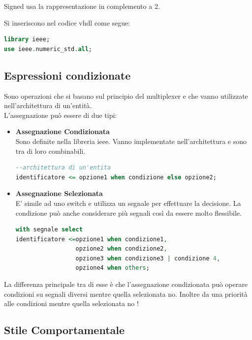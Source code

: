 \documentclass[a4paper]{book}
\begin{document}
Signed usa la rappresentazione in complemento a 2.


Si inseriscono nel codice vhdl come segue:

\begin{lstlisting}[language=VHDL]
library ieee;
use ieee.numeric_std.all;
\end{lstlisting}

\subsection{Espressioni condizionate}

Sono operazioni che si basano sul principio del multiplexer e che vanno utilizzate nell'architettura di un'entità.\\
L'assegnazione può essere di due tipi:

\begin{itemize}
\item\textbf{Assegnazione Condizionata}\\
Sono definite nella libreria ieee.
Vanno implementate nell'architettura e sono tra di loro combinabili.
\begin{lstlisting}[language = VHDL]
--architettura di un'entita
identificatore <= opzione1 when condizione else opzione2;
\end{lstlisting}
\item\textbf{Assegnazione Selezionata}\\
E' simile ad uno switch e utilizza un segnale per effettuare la decisione.
La condizione può anche considerare più segnali così da essere molto flessibile.

\begin{lstlisting}[language=VHDL]
with segnale select
identificatore <=opzione1 when condizione1,
                 opzione2 when condizione2,
                 opzione3 when condizione3 | condizione 4,
                 opzione4 when others;
\end{lstlisting}
\end{itemize}

La differenza principale tra di esse è che l'assegnazione condizionata può operare condizioni su segnali diversi mentre quella selezionata no. Inoltre da una priorità alle condizioni mentre quella selezionata no !

\subsection{Stile Comportamentale}
\end{document}
